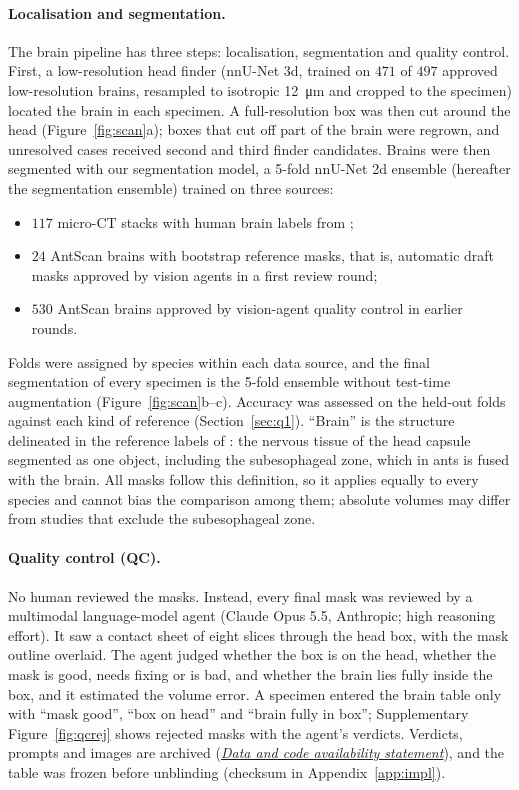 \documentclass[11pt]{article}
\begin{document}
\paragraph{Localisation and segmentation.} The brain pipeline has three steps: localisation, segmentation and quality
control. First, a low-resolution head finder (nnU-Net 3d, trained on $471$ of $497$ approved low-resolution brains,
resampled to isotropic \qty{12}{\um} and cropped to the specimen) located the brain in each specimen. A
full-resolution box was then cut around the head (Figure~\ref{fig:scan}a); boxes that cut off part of the brain were
regrown, and unresolved cases received second and third finder candidates. Brains were then segmented with our
segmentation model, a 5-fold nnU-Net 2d ensemble (hereafter the segmentation ensemble) trained on three sources:
\begin{itemize}[nosep]
\item $117$ micro-CT stacks with human brain labels from \citet{toulkeridou2023};
\item $24$ AntScan brains with bootstrap reference masks, that is, automatic draft masks approved by vision agents in a
first review round;
\item $530$ AntScan brains approved by vision-agent quality control in earlier rounds.
\end{itemize}
Folds were assigned by species within each data source, and the final segmentation of every specimen is the 5-fold
ensemble without test-time augmentation (Figure~\ref{fig:scan}b--c). Accuracy was assessed on the held-out folds
against each kind of reference (Section~\ref{sec:q1}). ``Brain'' is the structure delineated in the reference labels of \citet{toulkeridou2023}: the nervous
tissue of the head capsule segmented as one object, including the subesophageal zone, which in ants is fused with the
brain. All masks follow this definition, so it applies equally to every species and cannot bias the comparison among
them; absolute volumes may differ from studies that exclude the subesophageal zone.

\paragraph{Quality control (QC).} No human reviewed the masks. Instead, every final mask was reviewed by a multimodal
language-model agent (Claude Opus 5.5, Anthropic; high reasoning effort). It saw a contact sheet of eight slices
through the head box, with the mask outline overlaid. The agent judged whether the box is on the head, whether the
mask is good, needs fixing or is bad, and whether the brain lies fully inside the box, and it estimated the volume
error. A specimen entered the brain table only with ``mask good'', ``box on head'' and ``brain fully in box'';
Supplementary Figure~\ref{fig:qcrej} shows rejected masks with the agent's verdicts. Verdicts, prompts and images are
archived (\hyperref[sec:data]{\emph{Data and code availability statement}}), and the table was frozen before
unblinding (checksum in Appendix~\ref{app:impl}).
\end{document}
